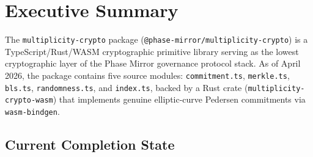 \documentclass[11pt,letterpaper]{article}
\begin{document}
\begin{abstract}
\noindent
We present the design, mathematical foundations, and implementation roadmap for
\textbf{multiplicity-crypto}, a cryptographic primitive library operating as a core
component of the Phase Mirror governance protocol system. This report documents the
architectural decisions, prior art, and technical implementation plan for three
integrated subsystems: (1) a native WebAssembly (WASM) Pedersen commitment engine
over the BN254 elliptic curve, suitable for direct ZK-SNARK circuit verification under
Groth16 and Plonk backends; (2) a Quantum-State-Based Security (QSBS) encryption
engine unifying classical and quantum data through a frequency-mapped, multiplicity-
indexed encryption operator; and (3) a QKD Hybrid Encryption transport protocol
(v1.0.1) providing transcript-bound, HKDF-derived directional AEAD keys with
optional multiplicity profile extensions. The document establishes architectural
layer boundaries, mathematical formalism, code structure, known-vector test
methodology, and a sequenced implementation roadmap. All content constitutes
original work by Ryan Van Gelder and the Multiplicity Foundation.
\end{abstract}

\tableofcontents
\newpage

\section{Executive Summary}

The \texttt{multiplicity-crypto} package (\texttt{@phase-mirror/multiplicity-crypto})
is a TypeScript/Rust/WASM cryptographic primitive library serving as the lowest
cryptographic layer of the Phase Mirror governance protocol stack. As of April 2026,
the package contains five source modules:
\texttt{commitment.ts}, \texttt{merkle.ts}, \texttt{bls.ts}, \texttt{randomness.ts},
and \texttt{index.ts}, backed by a Rust crate
(\texttt{multiplicity-crypto-wasm}) that implements genuine elliptic-curve Pedersen
commitments via \texttt{wasm-bindgen}.

\subsection{Current Completion State}
\end{document}
